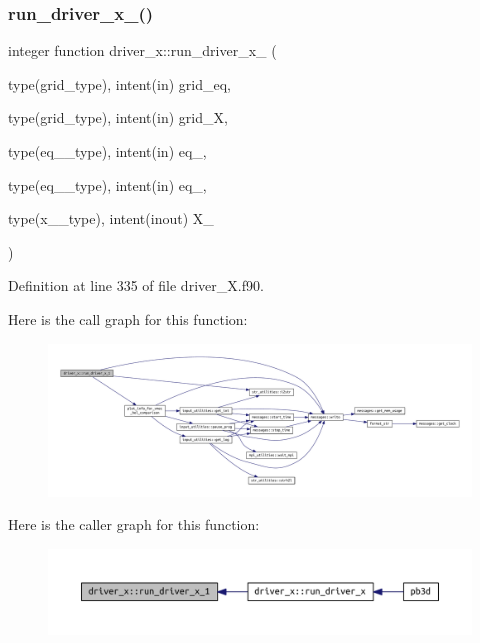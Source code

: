 \subsubsection{\texorpdfstring{run\+\_\+driver\+\_\+x\+\_()}{run\_driver\_x\_1()}}
{\footnotesize\ttfamily integer function driver\+\_\+x\+::run\+\_\+driver\+\_\+x\+\_ (\begin{DoxyParamCaption}\item[{type(grid\+\_\+type), intent(in)}]{grid\+\_\+eq,  }\item[{type(grid\+\_\+type), intent(in)}]{grid\+\_\+X,  }\item[{type(eq\+\_\+1\+\_\+type), intent(in)}]{eq\+\_,  }\item[{type(eq\+\_\+2\+\_\+type), intent(in)}]{eq\+\_,  }\item[{type(x\+\_\+1\+\_\+type), intent(inout)}]{X\+\_ }\end{DoxyParamCaption})}



Definition at line 335 of file driver\+\_\+\+X.\+f90.

Here is the call graph for this function\+:
\nopagebreak
\begin{figure}[H]
\begin{center}
\leavevmode
\includegraphics[width=350pt]{namespacedriver__x_a454779cefa6da3714d32eedcec0ef7de_cgraph}
\end{center}
\end{figure}
Here is the caller graph for this function\+:
\nopagebreak
\begin{figure}[H]
\begin{center}
\leavevmode
\includegraphics[width=350pt]{namespacedriver__x_a454779cefa6da3714d32eedcec0ef7de_icgraph}
\end{center}
\end{figure}
\mbox{\label{namespacedriver__x_ad3924b3d66f336f0a9a9559eafffec8e}} 
